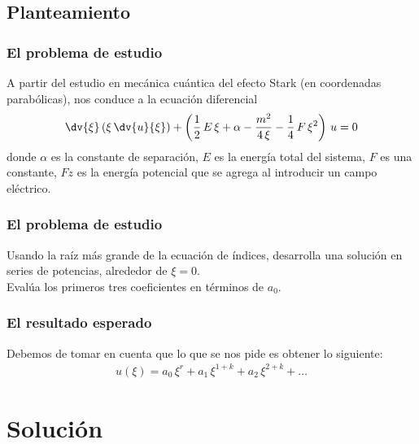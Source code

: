 \subsection{Planteamiento}
\begin{frame}
\frametitle{El problema de estudio}
A partir del estudio en mecánica cuántica del efecto Stark (en coordenadas parabólicas), nos conduce a la ecuación diferencial
\begin{align*}
\dv{\xi} \left( \xi\, \dv{u}{\xi} \right) + \left( \dfrac{1}{2} \, E \, \xi + \alpha - \dfrac{m^{2}}{4 \, \xi} - \dfrac{1}{4} \, F \, \xi^{2} \right) \, u = 0
\end{align*}
donde $\alpha$ es la constante de separación, $E$ es la energía total del sistema, $F$ es una constante, $Fz$ es la energía potencial que se agrega al introducir un campo eléctrico.
\end{frame}
\begin{frame}
\frametitle{El problema de estudio}
Usando la raíz más grande de la ecuación de índices, desarrolla una solución en series de potencias, alrededor de $\xi=0$.
\\
\bigskip
Evalúa los primeros tres coeficientes en términos de $a_{0}$.
\end{frame}
\begin{frame}
\frametitle{El resultado esperado}
Debemos de tomar en cuenta que lo que se nos pide es obtener lo siguiente:
\begin{align*}
u(\xi) = a_{0} \, \xi^{r} + a_{1} \, \xi ^{1+k} + a_{2} \, \xi ^{2+k} + \ldots 
\end{align*}
\end{frame}
\section{Solución}
